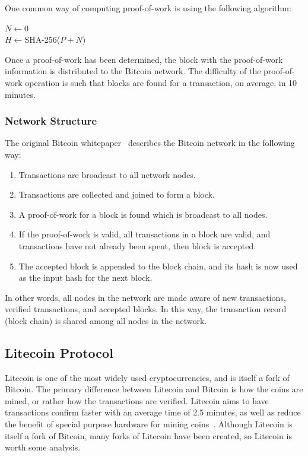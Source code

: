 \documentclass[11pt]{article}
\begin{document}
One common way of computing proof-of-work is using the following algorithm:
\begin{algorithm}[H]
    $N \gets 0$\\
    $H \gets ${\sc SHA-256($P + N$)}\\
\end{algorithm}\vspace{1em}

Once a proof-of-work has been determined, the block with the proof-of-work
information is distributed to the Bitcoin network. The difficulty of the
proof-of-work operation is such that blocks are found for a transaction, on
average, in 10 minutes.

\subsubsection{Network Structure}
The original Bitcoin whitepaper~\cite{nakamoto08} describes the Bitcoin network in the following
way:
\begin{enumerate}
    \item Transactions are broadcast to all network nodes.
    \item Transactions are collected and joined to form a block.
    \item A proof-of-work for a block is found which is broadcast to all nodes.
    \item If the proof-of-work is valid, all transactions in a block are valid,
        and transactions have not already been spent, then block is accepted.
    \item The accepted block is appended to the block chain, and its hash is now
        used as the input hash for the next block.
\end{enumerate}

In other words, all nodes in the network are made aware of new transactions,
verified transactions, and accepted blocks. In this way, the transaction record
(block chain) is shared among all nodes in the network.

\subsection{Litecoin Protocol}
Litecoin is one of the most widely used cryptocurrencies, and is itself a fork
of Bitcoin. The primary difference between Litecoin and Bitcoin is how the coins
are mined, or rather how the transactions are verified. Litecoin aims to have
transactions confirm faster with an average time of 2.5 minutes, as well as
reduce the benefit of special purpose hardware for mining coins~\cite{ahamad13}.
Although Litecoin is itself a fork of Bitcoin, many forks of Litecoin have been
created, so Litecoin is worth some analysis.
\end{document}
